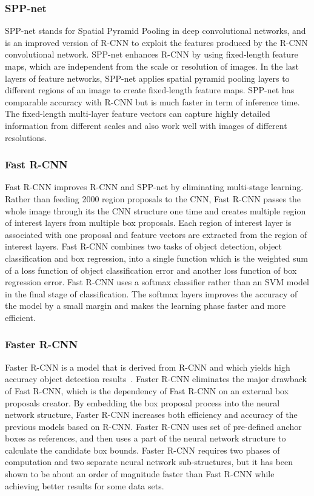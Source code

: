 \documentclass[conference]{IEEEtran}
\begin{document}
\subsubsection{SPP-net}
SPP-net stands for Spatial Pyramid Pooling in deep convolutional networks, and is an improved version of R-CNN to exploit the features produced by the R-CNN convolutional network. 
SPP-net enhances R-CNN by using fixed-length feature maps, which are independent from the scale or resolution of images. In the last layers of feature networks, SPP-net applies spatial pyramid pooling layers to different regions of an image to create fixed-length feature maps.
SPP-net has comparable accuracy with R-CNN but is much faster in term of inference time. 
The fixed-length multi-layer feature vectors can capture highly detailed information from different scales and also work well with images of different resolutions.

\subsubsection{Fast R-CNN}
Fast R-CNN improves R-CNN and SPP-net by eliminating multi-stage learning. 
Rather than feeding 2000 region proposals to the CNN, Fast R-CNN passes the whole image through its the CNN structure one time and creates multiple region of interest layers from multiple box proposals. 
Each region of interest layer is associated with one proposal and feature vectors are extracted from the region of interest layers.
Fast R-CNN combines two tasks of object detection, object classification and box regression, into a single function which is the weighted sum of a loss function of object classification error and another loss function of box regression error.
Fast R-CNN uses a softmax classifier rather than an SVM model in the final stage of classification. The softmax layers improves the accuracy of the model by a small margin  and makes the learning phase faster and more efficient.

\subsubsection{Faster R-CNN}
Faster R-CNN is a model that is derived from R-CNN and which yields high accuracy object detection results~\cite{girshick2015fast}. 
Faster R-CNN eliminates the major drawback of Fast R-CNN, which is the dependency of Fast R-CNN on an external box proposals creator. 
By embedding the box proposal process into the neural network structure, Faster R-CNN increases both efficiency and accuracy of the previous models based on R-CNN.  
Faster R-CNN uses set of pre-defined anchor boxes as references, and then uses a part of the neural network structure to calculate the candidate box bounds.   
Faster R-CNN requires two phases of computation and two separate neural network sub-structures,
but it has been shown to be about an order of magnitude faster than Fast R-CNN while achieving better results for some data sets. 
\end{document}
